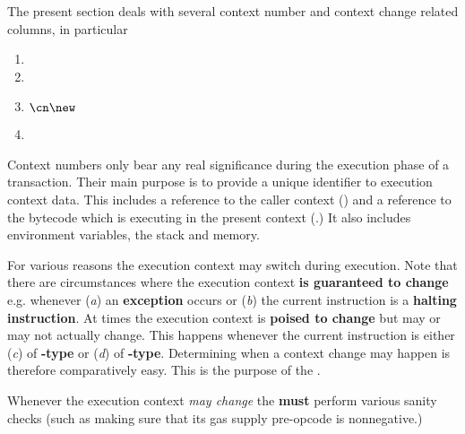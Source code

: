 The present section deals with several context number and context change related columns, in particular
\begin{multicols}{4}
	\begin{enumerate}
		\item \cmc
		\item \cn
		\item $\cn\new$
		\item \caller
	\end{enumerate}
\end{multicols}
Context numbers only bear any real significance during the execution phase of a transaction.
Their main purpose is to provide a unique identifier to execution context data.
This includes a reference to the caller context (\caller) and a reference to the bytecode which is executing in the present context (\cfi.)
It also includes environment variables, the stack and memory.

For various reasons the execution context may switch during execution.
Note that there are circumstances where the execution context \textbf{is guaranteed to change} e.g. whenever
(\emph{a}) an \textbf{exception} occurs or
(\emph{b}) the current instruction is a \textbf{halting instruction}.
At times the execution context is \textbf{poised to change} but may or may not actually change.
This happens whenever the current instruction is either
(\emph{c}) of \textbf{-type} or
(\emph{d}) of \textbf{-type}.
Determining when a context change may happen is therefore comparatively easy.
This is the purpose of the \cmc{}.

\saNote{} Whenever the execution context \emph{may change} the \zkEvm{} \textbf{must} perform various sanity checks (such as making sure that its gas supply pre-opcode is nonnegative.)

